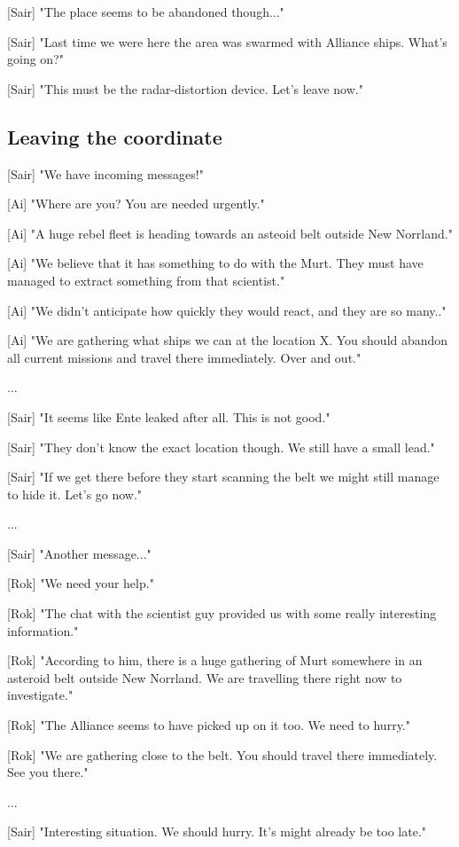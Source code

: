 \documentclass[a4paper,12pt]{article}
\begin{document}
[Sair] "The place seems to be abandoned though..."

[Sair] "Last time we were here the area was swarmed with Alliance ships. What's going on?"

[Sair] "This must be the radar-distortion device. Let's leave now."

\subsection{Leaving the coordinate}

[Sair] "We have incoming messages!"

[Ai] "Where are you? You are needed urgently."

[Ai] "A huge rebel fleet is heading towards an asteoid belt outside New Norrland." 

[Ai] "We believe that it has something to do with the Murt. They must have managed to extract something from that scientist." 

[Ai] "We didn't anticipate how quickly they would react, and they are so many.." 

[Ai] "We are gathering what ships we can at the location X. You should abandon all current missions and travel there
immediately. Over and out."

...

[Sair] "It seems like Ente leaked after all. This is not good."

[Sair] "They don't know the exact location though. We still have a small lead." 

[Sair] "If we get there before they start scanning the belt we might still manage to hide it. Let's go now."

...

[Sair] "Another message..."

[Rok] "We need your help." 

[Rok] "The chat with the scientist guy provided us with some really interesting information." 

[Rok] "According to him, there is a huge gathering of Murt somewhere in an asteroid belt outside New Norrland. We are travelling there right now to investigate."

[Rok] "The Alliance seems to have picked up on it too. We need to hurry." 

[Rok] "We are gathering close to the belt. You should travel there immediately. See you there."

...

[Sair] "Interesting situation. We should hurry. It's might already be too late."
\end{document}
